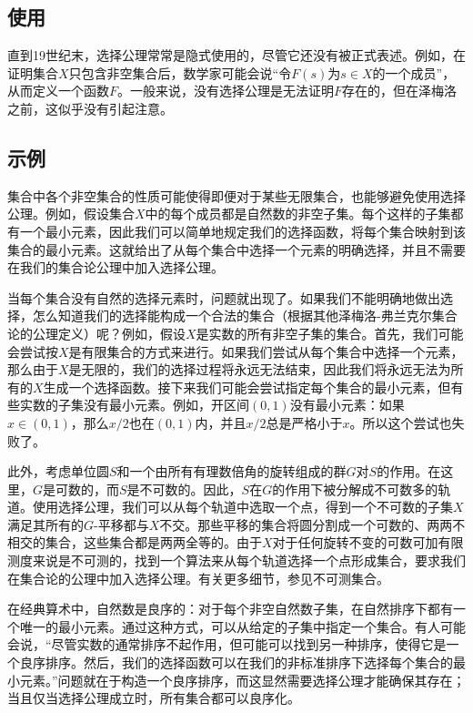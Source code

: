 \subsection{使用} 
直到19世纪末，选择公理常常是隐式使用的，尽管它还没有被正式表述。例如，在证明集合\(X\)只包含非空集合后，数学家可能会说“令\(F(s)\)为\(s \in X\)的一个成员”，从而定义一个函数\(F\)。一般来说，没有选择公理是无法证明\(F\)存在的，但在泽梅洛之前，这似乎没有引起注意。
\subsection{示例}  
集合中各个非空集合的性质可能使得即便对于某些无限集合，也能够避免使用选择公理。例如，假设集合\(X\)中的每个成员都是自然数的非空子集。每个这样的子集都有一个最小元素，因此我们可以简单地规定我们的选择函数，将每个集合映射到该集合的最小元素。这就给出了从每个集合中选择一个元素的明确选择，并且不需要在我们的集合论公理中加入选择公理。

当每个集合没有自然的选择元素时，问题就出现了。如果我们不能明确地做出选择，怎么知道我们的选择能构成一个合法的集合（根据其他泽梅洛-弗兰克尔集合论的公理定义）呢？例如，假设\(X\)是实数的所有非空子集的集合。首先，我们可能会尝试按\(X\)是有限集合的方式来进行。如果我们尝试从每个集合中选择一个元素，那么由于\(X\)是无限的，我们的选择过程将永远无法结束，因此我们将永远无法为所有的\(X\)生成一个选择函数。接下来我们可能会尝试指定每个集合的最小元素，但有些实数的子集没有最小元素。例如，开区间\((0,1)\)没有最小元素：如果\(x \in (0,1)\)，那么\(x/2\)也在\((0,1)\)内，并且\(x/2\)总是严格小于\(x\)。所以这个尝试也失败了。

此外，考虑单位圆\(S\)和一个由所有有理数倍角的旋转组成的群\(G\)对\(S\)的作用。在这里，\(G\)是可数的，而\(S\)是不可数的。因此，\(S\)在\(G\)的作用下被分解成不可数多的轨道。使用选择公理，我们可以从每个轨道中选取一个点，得到一个不可数的子集\(X\)满足其所有的\(G\)-平移都与\(X\)不交。那些平移的集合将圆分割成一个可数的、两两不相交的集合，这些集合都是两两全等的。由于\(X\)对于任何旋转不变的可数可加有限测度来说是不可测的，找到一个算法来从每个轨道选择一个点形成集合，要求我们在集合论的公理中加入选择公理。有关更多细节，参见不可测集合。

在经典算术中，自然数是良序的：对于每个非空自然数子集，在自然排序下都有一个唯一的最小元素。通过这种方式，可以从给定的子集中指定一个集合。有人可能会说，“尽管实数的通常排序不起作用，但可能可以找到另一种排序，使得它是一个良序排序。然后，我们的选择函数可以在我们的非标准排序下选择每个集合的最小元素。”问题就在于构造一个良序排序，而这显然需要选择公理才能确保其存在；当且仅当选择公理成立时，所有集合都可以良序化。
